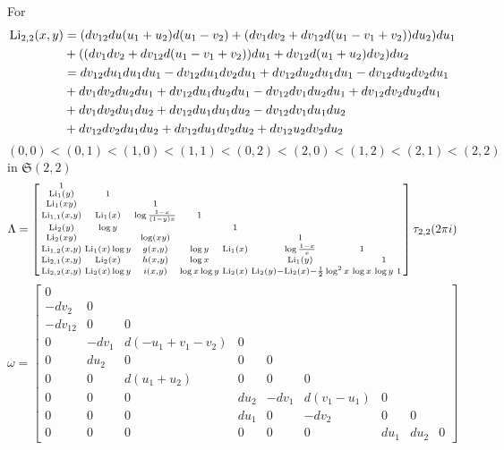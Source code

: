 \documentclass[main]{subfiles}
\begin{document}
\begin{example}
For
\begin{align*}
\operatorname{Li}_{2,2}(x,y)&=(dv_{12}du(u_1+u_2)d(u_1-v_2)+(dv_1dv_2+dv_{12}d(u_1-v_1+v_2))du_2)du_1 \\
&+((dv_1dv_2+dv_{12}d(u_1-v_1+v_2))du_1+dv_{12}d(u_1+u_2)dv_2)du_2 \\
&=dv_{12}du_1du_1du_1-dv_{12}du_1dv_2du_1+dv_{12}du_2du_1du_1-dv_{12}du_2dv_2du_1 \\
&+dv_1dv_2du_2du_1+dv_{12}du_1du_2du_1-dv_{12}dv_1du_2du_1+dv_{12}dv_2du_2du_1 \\
&+dv_1dv_2du_1du_2+dv_{12}du_1du_1du_2-dv_{12}dv_1du_1du_2 \\
&+dv_{12}dv_2du_1du_2+dv_{12}du_1dv_2du_2+dv_{12}u_2dv_2du_2
\end{align*}
$(0,0)<(0,1)<(1,0)<(1,1)<(0,2)<(2,0)<(1,2)<(2,1)<(2,2)$ in $\mathfrak S(2,2)$
\[\Lambda=\left[\begin{smallmatrix}
1&&&&&&&&\\
\operatorname{Li}_{1}(y)&1&&&&&&&\\
\operatorname{Li}_{1}(xy)&&1&&&&&&\\
\operatorname{Li}_{1,1}(x,y)&\operatorname{Li}_1(x)&\log\frac{1-x}{(1-y)x}&1&&&&&\\
\operatorname{Li}_{2}(y)&\log y&&&1&&&&\\
\operatorname{Li}_{2}(xy)&&\log(xy)&&&1&&&\\
\operatorname{Li}_{1,2}(x,y)&\operatorname{Li}_1(x)\log y&g(x,y)&\log y&\operatorname{Li}_1(x)&\log\frac{1-x}{x}&1&&\\
\operatorname{Li}_{2,1}(x,y)&\operatorname{Li}_2(x)&h(x,y)&\log x&&\operatorname{Li}_1(y)&&1&\\
\operatorname{Li}_{2,2}(x,y)&\operatorname{Li}_2(x)\log y&i(x,y)&\log x\log y&\operatorname{Li}_2(x)&\operatorname{Li}_2(y)-\operatorname{Li}_2(x)-\frac{1}{2}\log^2x&\log x&\log y&1
\end{smallmatrix}\right]\tau_{2,2}(2\pi i)\]
\[\omega=\begin{bmatrix}
0&&&&&&&&\\
-dv_2&0&&&&&&&\\
-dv_{12}&0&0&&&&&\\
0&-dv_1&d(-u_1+v_1-v_2)&0&&&&&\\
0&du_2&0&0&0&&&&\\
0&0&d(u_1+u_2)&0&0&0&&&\\
0&0&0&du_2&-dv_1&d(v_1-u_1)&0&&\\
0&0&0&du_1&0&-dv_2&0&0&\\
0&0&0&0&0&0&du_1&du_2&0
\end{bmatrix}\]
\end{example}
\end{document}
